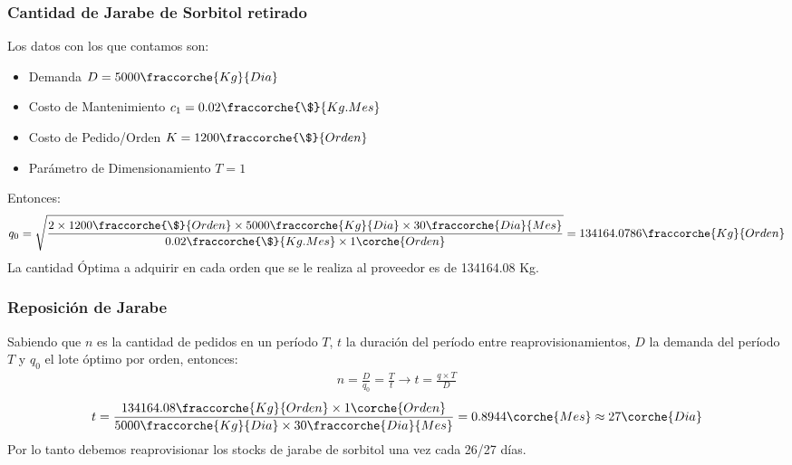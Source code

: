 \begin{homeworkProblem}
\subsubsection{Cantidad de Jarabe de Sorbitol retirado}
Los datos con los que contamos son:
\begin{itemize}
    \item Demanda $D=5000\fraccorche{Kg}{Dia}$
    \item Costo de Mantenimiento $c_1=0.02\fraccorche{\$}{Kg.Mes}$
    \item Costo de Pedido/Orden $K=1200\fraccorche{\$}{Orden}$
    \item Parámetro de Dimensionamiento $T=1$
\end{itemize}
Entonces:
\begin{align*}
    q_0=\sqrt{
        \frac{
            2\times 1200\fraccorche{\$}{Orden}\times 5000\fraccorche{Kg}{Dia} \times 30\fraccorche{Dia}{Mes}
            }{
                0.02\fraccorche{\$}{Kg.Mes}\times 1\corche{Orden}
            }
        }
        =
        134164.0786\fraccorche{Kg}{Orden}
\end{align*}
La cantidad Óptima a adquirir en cada orden que se le realiza al proveedor es de 134164.08 Kg.

\subsubsection{Reposición de Jarabe}
Sabiendo que $n$ es la cantidad de pedidos en un período $T$, $t$ la duración del período entre reaprovisionamientos, $D$ la demanda del período $T$ y $q_0$ el lote óptimo por orden, entonces:
\begin{align*}
    n=\frac{D}{q_0}=\frac{T}{t} \rightarrow t = \frac{q\times T}{D}
\end{align*}
\begin{align*}
    t = \frac{
            134164.08\fraccorche{Kg}{Orden}\times 1 \corche{Orden}
        }{
            5000\fraccorche{Kg}{Dia}\times 30\fraccorche{Dia}{Mes}
        } =  0.8944\corche{Mes} \approx 27\corche{Dia}       
\end{align*}
Por lo tanto debemos reaprovisionar los stocks de jarabe de sorbitol una vez cada 26/27 días.


\end{homeworkProblem}
